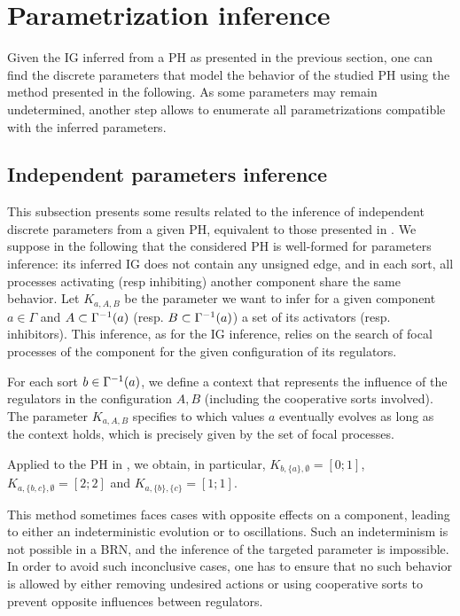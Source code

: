 \section{Parametrization inference}\label{sec:infer-K}

Given the IG inferred from a PH as presented in the previous section, one can find the discrete parameters that model the behavior of the studied PH using the method presented in the following.
As some parameters may remain undetermined, another step allows to enumerate all parametrizations compatible with the inferred parameters.

\subsection{Independent parameters inference}

This subsection presents some results related to the inference of independent discrete parameters from a given PH,
equivalent to those presented in \cite{PMR10-TCSB}.
We suppose in the following that the considered PH is well-formed for parameters inference: its inferred IG does not contain any unsigned edge,
and in each sort, all processes activating (resp inhibiting) another component share the same behavior.
Let $K_{a,A,B}$ be the parameter we want to infer for a given component $a \in \Gamma$
and $A \subset \Gamma^{-1}(a)$ (resp. $B \subset \Gamma^{-1}(a)$) a set of its activators (resp. inhibitors).
This inference, as for the IG inference, relies on the search of focal processes of the component for the given configuration of its regulators.

For each sort $b \in \Gamma^{-1}(a)$, we define a context
that represents the influence of the regulators in the configuration $A,B$ (including the cooperative sorts involved).
The parameter $K_{a,A,B}$ specifies to which values $a$ eventually evolves as long as the context
holds, which is precisely given by the set of focal processes.

\begin{example*}
Applied to the PH in , we obtain, in particular,
$K_{b,\{a\},\emptyset} = [0 ; 1]$,
$K_{a,\{b,c\},\emptyset} = [2 ; 2]$ and
$K_{a,\{b\},\{c\}} = [1;1]$.
\end{example*}

This method sometimes faces cases with opposite effects on a component, leading to either an indeterministic evolution or to oscillations.
Such an indeterminism is not possible in a BRN, and the inference of the targeted parameter is impossible.
In order to avoid such inconclusive cases, one has to ensure that no such behavior is allowed
by either removing undesired actions or using cooperative sorts to prevent opposite influences between regulators.

